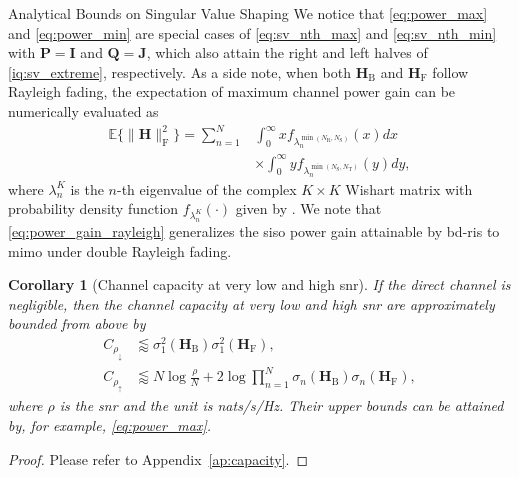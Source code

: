 \documentclass[journal]{IEEEtran}
\newtheorem{corollary}{Corollary}[proposition]
\begin{document}
\begin{section}{Analytical Bounds on Singular Value Shaping}
		We notice that \eqref{eq:power_max} and \eqref{eq:power_min} are special cases of \eqref{eq:sv_nth_max} and \eqref{eq:sv_nth_min} with $\mathbf{P} = \mathbf{I}$ and $\mathbf{Q} = \mathbf{J}$, which also attain the right and left halves of \eqref{iq:sv_extreme}, respectively.
		As a side note, when both $\mathbf{H}_\mathrm{B}$ and $\mathbf{H}_\mathrm{F}$ follow Rayleigh fading, the expectation of maximum channel power gain can be numerically evaluated as
		\begin{equation}
			\begin{split}
				\mathbb{E}\bigl\{ \lVert \mathbf{H} \rVert _ \mathrm{F}^2 \bigr\} = \sum_{n=1}^N
				& \int_0^\infty x f_{\lambda_n^{\min(N_\mathrm{R},N_\mathrm{S})}}(x) d x \\
				& \times \int_0^\infty y f_{\lambda_n^{\min(N_\mathrm{S},N_\mathrm{T})}}(y) d y,
			\end{split}
			\label{eq:power_gain_rayleigh}
		\end{equation}
		where $\lambda_n^{K}$ is the $n$-th eigenvalue of the complex $K \times K$ Wishart matrix with probability density function $f_{\lambda_n^{K}}(\cdot)$ given by \cite[(51)]{Zanella2009}.
		We note that \eqref{eq:power_gain_rayleigh} generalizes the \gls{siso} power gain attainable by \gls{bd}-\gls{ris} \cite[(58)]{Shen2020a} to \gls{mimo} under double Rayleigh fading.

		\begin{corollary}[Channel capacity at very low and high \gls{snr}\label{co:capacity}]
			If the direct channel is negligible, then the channel capacity at very low and high \gls{snr} are approximately bounded from above by
			\begin{subequations}
				\begin{align}
					C_{\rho_\downarrow} & \lessapprox \sigma_1^2(\mathbf{H}_\mathrm{B}) \sigma_1^2(\mathbf{H}_\mathrm{F}), \label{iq:capacity_snr_low} \\
					C_{\rho_\uparrow} & \lessapprox N \log \frac{\rho}{N} + 2 \log \prod_{n=1}^N \sigma_n(\mathbf{H}_\mathrm{B}) \sigma_n(\mathbf{H}_\mathrm{F}), \label{iq:capacity_snr_high}
				\end{align}
			\end{subequations}
			where $\rho$ is the \gls{snr} and the unit is nats/s/Hz.
			Their upper bounds can be attained by, for example, \eqref{eq:power_max}.
		\end{corollary}

		\begin{proof}
			Please refer to Appendix~\ref{ap:capacity}.
		\end{proof}


\end{section}
\end{document}
